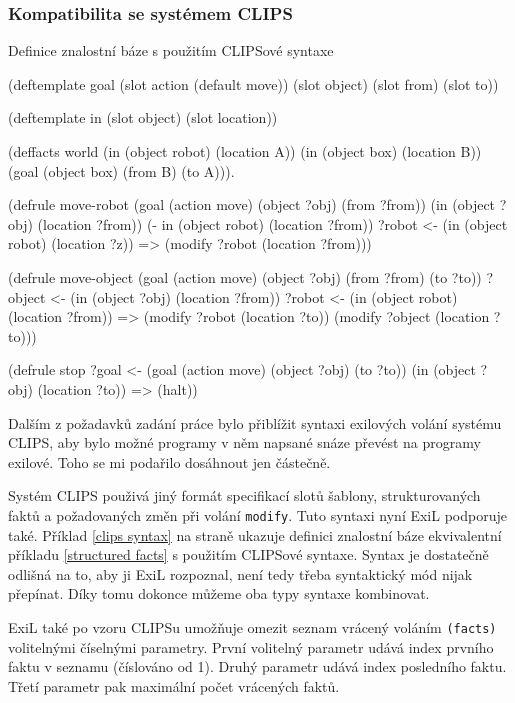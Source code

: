 \subsubsection{Kompatibilita se systémem CLIPS}

\begin{listing}[t]
\caption{Definice znalostní báze s použitím CLIPSové syntaxe}
\label{clips syntax}
\begin{clcode}
(deftemplate goal
  (slot action (default move))
  (slot object)
  (slot from)
  (slot to))

(deftemplate in
  (slot object)
  (slot location))

(deffacts world
  (in (object robot) (location A))
  (in (object box) (location B))
  (goal (object box) (from B) (to A))).

(defrule move-robot
  (goal (action move) (object ?obj) (from ?from))
  (in (object ?obj) (location ?from))
  (- in (object robot) (location ?from))
  ?robot <- (in (object robot) (location ?z))
  =>
  (modify ?robot (location ?from)))

(defrule move-object
  (goal (action move) (object ?obj) (from ?from) (to ?to))
  ?object <- (in (object ?obj) (location ?from))
  ?robot <- (in (object robot) (location ?from))
  =>
  (modify ?robot (location ?to))
  (modify ?object (location ?to)))

(defrule stop
  ?goal <- (goal (action move) (object ?obj) (to ?to))
  (in (object ?obj) (location ?to))
  =>
  (halt))
\end{clcode}
\end{listing}

Dalším z požadavků zadání práce bylo přiblížit syntaxi exilových volání systému
CLIPS, aby bylo možné programy v něm napsané snáze převést na programy exilové.
Toho se mi podařilo dosáhnout jen částečně.

\FloatBarrier

Systém CLIPS použivá jiný formát specifikací slotů šablony, strukturovaných
faktů a požadovaných změn při volání \verb|modify|. Tuto syntaxi nyní ExiL podporuje
také. Příklad \ref{clips syntax} na straně \pageref{clips syntax} ukazuje
definici znalostní báze ekvivalentní příkladu \ref{structured facts} s použitím
CLIPSové syntaxe. Syntax je dostatečně odlišná na to, aby ji ExiL rozpoznal,
není tedy třeba syntaktický mód nijak přepínat. Díky tomu dokonce můžeme oba
typy syntaxe kombinovat.

ExiL také po vzoru CLIPSu umožňuje omezit seznam vrácený voláním \verb|(facts)|
volitelnými číselnými parametry. První volitelný parametr udává index prvního
faktu v seznamu (číslováno od 1). Druhý parametr udává index posledního faktu.
Třetí parametr pak maximální počet vrácených faktů.

